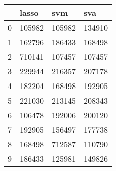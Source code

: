 \begin{tabular}{llll}
\toprule
 & lasso & svm & sva \\
\midrule
0 & 105982 & 105982 & 134910 \\
1 & 162796 & 186433 & 168498 \\
2 & 710141 & 107457 & 107457 \\
3 & 229944 & 216357 & 207178 \\
4 & 182204 & 168498 & 192905 \\
5 & 221030 & 213145 & 208343 \\
6 & 106478 & 192006 & 200120 \\
7 & 192905 & 156497 & 177738 \\
8 & 168498 & 712587 & 110790 \\
9 & 186433 & 125981 & 149826 \\
\bottomrule
\end{tabular}
